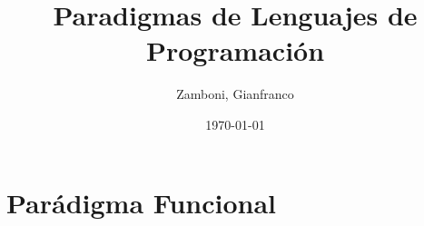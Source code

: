 \documentclass[10pt,a4paper]{book}
\begin{document}
\title{Paradigmas de Lenguajes de Programación}

\date{\today}

\author{Zamboni, Gianfranco}
\begin{titlepage}
    \maketitle
    \thispagestyle{empty}
    \tableofcontents
\end{titlepage}

\newpage
\setcounter{page}{1}


\newpage

\chapter{Parádigma Funcional}






\appendix


\newpage

\end{document}
